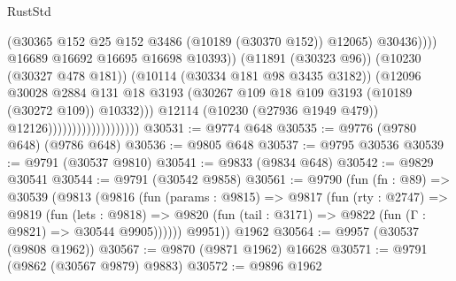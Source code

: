 \begin{lexlean}{RustStd}
\begin{coremodule}
                                                        (@30365
                                                          @152
                                                          @25
                                                          @152
                                                          @3486
                                                          (@10189 (@30370 @152))
                                                          @12065)
                                                        @30436))))
                                                @16689
                                                @16692
                                                @16695
                                                @16698
                                                @10393))
                                            (@11891 (@30323 @96))
                                            (@10230 (@30327 @478 @181))
                                            (@10114 (@30334 @181 @98 @3435 @3182))
                                            (@12096
                                              @30028
                                              @2884
                                              @131
                                              @18
                                              @3193
                                              (@30267
                                                @109
                                                @18
                                                @109
                                                @3193
                                                (@10189 (@30272 @109))
                                                @10332)))
                                          @12114
                                          (@10230 (@27936 @1949 @479))
                                          @12126)))))))))))))))))))
@30531 := @9774 @648
@30535 := @9776 (@9780 @648) (@9786 @648)
@30536 := @9805 @648
@30537 := @9795 @30536
@30539 := @9791 (@30537 @9810)
@30541 := @9833 (@9834 @648)
@30542 := @9829 @30541
@30544 := @9791 (@30542 @9858)
@30561 := @9790
    (fun (fn : @89) =>
    @30539
      (@9813
        (@9816
          (fun (params : @9815) =>
          @9817
            (fun (rty : @2747) =>
            @9819
              (fun (lets : @9818) =>
              @9820 (fun (tail : @3171) => @9822 (fun (Γ : @9821) => @30544 @9905))))))
        @9951))
    @1962
@30564 := @9957 (@30537 (@9808 @1962))
@30567 := @9870 (@9871 @1962) @16628
@30571 := @9791 (@9862 (@30567 @9879) @9883)
@30572 := @9896 @1962

\end{coremodule}
\end{lexlean}
